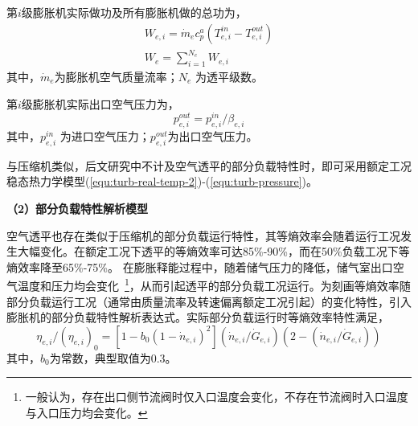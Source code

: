 第$i$级膨胀机实际做功及所有膨胀机做的总功为，
\begin{subequations}
\label{equ:turb-power-all}
\begin{gather}
{W_{e,i}} = {\dot m_e}c_p^a({T_{e,i}^{in} - T_{e,i}^{out}})\label{equ:turb-power}\\
{W_e} = \sum\limits_{i = 1}^{{N_e}} {{W_{e,i}}}\label{equ:turb-power-total}
\end{gather}
\end{subequations}
其中，$\dot m_e$为膨胀机空气质量流率；$N_e$ 为透平级数。

第$i$级膨胀机实际出口空气压力为，
\begin{equation}
\label{equ:turb-pressure}
p_{e,i}^{out} = p_{e,i}^{in}/{\beta _{e,i}}
\end{equation}
其中，$p_{e,i}^{in}$ 为进口空气压力；$p_{e,i}^{out}$为出口空气压力。

与压缩机类似，后文研究中不计及空气透平的部分负载特性时，即可采用额定工况稳态热力学模型(\ref{equ:turb-real-temp-2})-(\ref{equ:turb-pressure})。

\textbf{（2）部分负载特性解析模型}

空气透平也存在类似于压缩机的部分负载运行特性，其等熵效率会随着运行工况发生大幅变化。在额定工况下透平的等熵效率可达85\%-90\%，而在50\%负载工况下等熵效率降至65\%-75\%\cite{CAES-Review-18-Rui-operation,CAES-Discharge-16}。 在膨胀释能过程中，随着储气压力的降低，储气室出口空气温度和压力均会变化~\footnote{一般认为，存在出口侧节流阀时仅入口温度会变化，不存在节流阀时入口温度与入口压力均会变化。}，从而引起透平的部分负载工况运行。为刻画等熵效率随部分负载运行工况（通常由质量流率及转速偏离额定工况引起）的变化特性，引入膨胀机的部分负载特性解析表达式。实际部分负载运行时等熵效率特性满足\cite{Compressor-thermo-02, AA-CAES-Simulation-19}，
\begin{equation}
\label{equ:turb-eff-part}
{\eta _{e,i}}/{({{\eta _{e,i}}})_0} = [{1 - {b_0}{{({1 - {{\dot n}_{e,i}}})}^2}}]({{{\dot n}_{e,i}}/{{\dot G}_{e,i}}})({2 -({{{\dot n}_{e,i}}/{{\dot G}_{e,i}}})})
\end{equation}
其中，$b_0$为常数，典型取值为0.3\cite{Compressor-thermo-02}。

